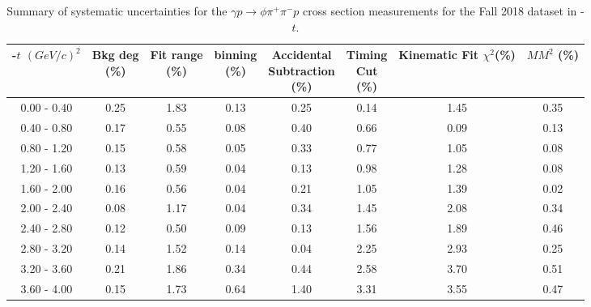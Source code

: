 \begin{center}
\begin{table}[!htbp]
    \small
    \centering
    \caption{Summary of systematic uncertainties for the $\gamma p \rightarrow \phi \pi^{+} \pi^{-} p$ cross section measurements for the Fall 2018 dataset in -$t$.}
    \label{tab.y2175.syserr.phi2pi.4.2}
    \begin{tabular}{|c|c|c|c|c|c|c|c|}
        \hline
        -$t$ $(GeV/c)^{2}$&\thead{Bkg deg\\(\%)}&\thead{Fit range\\(\%)}&\thead{binning\\(\%)}&\thead{Accidental\\Subtraction\\(\%)}&\thead{Timing\\Cut\\(\%)}&\thead{Kinematic\\Fit $\chi^{2}$(\%)}&\thead{$MM^{2}$\\(\%)}\\
        \hline
        0.00 - 0.40 & 0.25 & 1.83 & 0.13 & 0.25 & 0.14 & 1.45 & 0.35 \\ 
        0.40 - 0.80 & 0.17 & 0.55 & 0.08 & 0.40 & 0.66 & 0.09 & 0.13 \\ 
        0.80 - 1.20 & 0.15 & 0.58 & 0.05 & 0.33 & 0.77 & 1.05 & 0.08 \\ 
        1.20 - 1.60 & 0.13 & 0.59 & 0.04 & 0.13 & 0.98 & 1.28 & 0.08 \\ 
        1.60 - 2.00 & 0.16 & 0.56 & 0.04 & 0.21 & 1.05 & 1.39 & 0.02 \\ 
        2.00 - 2.40 & 0.08 & 1.17 & 0.04 & 0.34 & 1.45 & 2.08 & 0.34 \\ 
        2.40 - 2.80 & 0.12 & 0.50 & 0.09 & 0.13 & 1.56 & 1.89 & 0.46 \\ 
        2.80 - 3.20 & 0.14 & 1.52 & 0.14 & 0.04 & 2.25 & 2.93 & 0.25 \\ 
        3.20 - 3.60 & 0.21 & 1.86 & 0.34 & 0.44 & 2.58 & 3.70 & 0.51 \\ 
        3.60 - 4.00 & 0.15 & 1.73 & 0.64 & 1.40 & 3.31 & 3.55 & 0.47 \\
        \hline
    \end{tabular}
\end{table}
\null
\vfill
\end{center}

